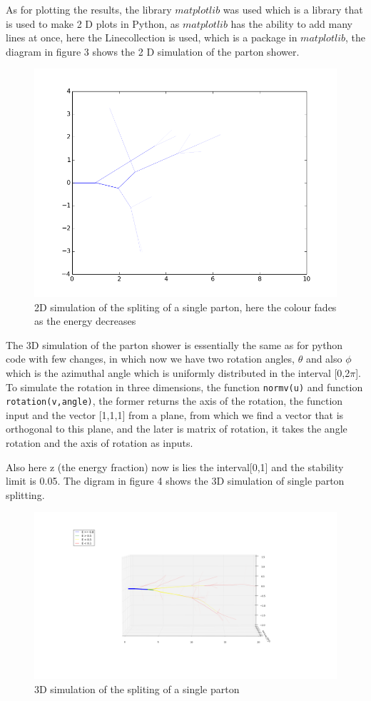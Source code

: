 As for plotting the results, the library $matplotlib$ was used which is a library that is used to make 2 D plots in Python, as $matplotlib$ has the ability to add many lines at once, here the Linecollection is used, which is a package in $matplotlib$, the diagram in figure 3 shows the 2 D simulation of the parton shower.  \begin{figure}[H]
\centering
\includegraphics[scale=.5]{images/2D_partonshower.png}
\caption{2D simulation of the spliting of a single parton, here the colour fades as the energy decreases}
\end{figure}

The 3D simulation of the parton shower is essentially the same as for python code with few changes, in which now we have two rotation angles, $\theta$ and also $\phi$ which is the azimuthal angle which is uniformly distributed in the interval [0,2$\pi$]. To simulate the rotation in three dimensions, the function \verb $normv(u)$ and function \verb !rotation(v,angle)!, the former returns the axis of the rotation, the function input and the vector [1,1,1] from a plane, from which we find a vector that is orthogonal to this plane, and the later is matrix of rotation, it takes the angle rotation and the axis of rotation as inputs. 

Also here z (the energy fraction) now is lies the interval[0,1] and the stability limit is 0.05. The digram in figure 4 shows the 3D simulation of single parton splitting.

 
 \begin{figure}[H]
\centering
\includegraphics[scale=.3]{images/3D_partonshower.png}
\caption{3D simulation of the spliting of a single parton}
\end{figure}

